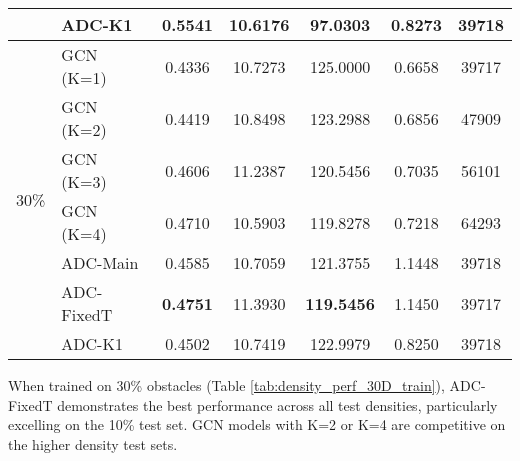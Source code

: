 \begin{table}[htbp]
\begin{tabular}{llccccc}
        & ADC-K1 & 0.5541 & 10.6176 & 97.0303 & 0.8273 & 39718 \\
        \midrule
        \multirow{7}{*}{30\%}
        & GCN (K=1) & 0.4336 & 10.7273 & 125.0000 & 0.6658 & 39717 \\
        & GCN (K=2) & 0.4419 & 10.8498 & 123.2988 & 0.6856 & 47909 \\
        & GCN (K=3) & 0.4606 & 11.2387 & 120.5456 & 0.7035 & 56101 \\
        & GCN (K=4) & 0.4710 & 10.5903 & 119.8278 & 0.7218 & 64293 \\
        & ADC-Main & 0.4585 & 10.7059 & 121.3755 & 1.1448 & 39718 \\
        & ADC-FixedT & \textbf{0.4751} & 11.3930 & \textbf{119.5456} & 1.1450 & 39717 \\
        & ADC-K1 & 0.4502 & 10.7419 & 122.9979 & 0.8250 & 39718 \\
        \bottomrule
    \end{tabular}
\end{table}
When trained on 30\% obstacles (Table \ref{tab:density_perf_30D_train}), ADC-FixedT demonstrates the best performance across all test densities, particularly excelling on the 10\% test set. GCN models with K=2 or K=4 are competitive on the higher density test sets.
\newpage

